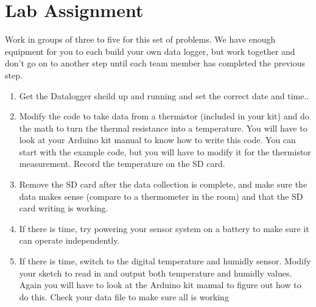 \section{Lab Assignment}
	
	Work in groups of three to five for this set of problems. We have enough equipment for you to each build your own data logger, but work together and don't go on to another step until each team member has completed the previous step.
	
	\begin{enumerate}
		\item Get the Datalogger sheild up and running and set the correct date and time..
		
		\item Modify the code to take data from a thermistor (included in your kit) and do the math to turn the thermal resistance into a temperature. You will have to look at your Arduino kit manual to know how to write this code. You can start with the example code, but you will have to modify it for the thermistor measurement. Record the temperature on the SD card.
		
		\item Remove the SD card after the data collection is complete, and make sure the data makes sense (compare to a thermometer in the room) and that the SD card writing is working.
		
		\item If there is time, try powering your sensor system on a battery to make sure it can operate independently.
		
		\item If there is time, switch to the digital temperature and humidly sensor. Modify your sketch to read in and output both temperature and humidly values. Again you will have to look at the Arduino kit manual to figure out how to do this. Check your data file to make sure all is working
	\end{enumerate}


